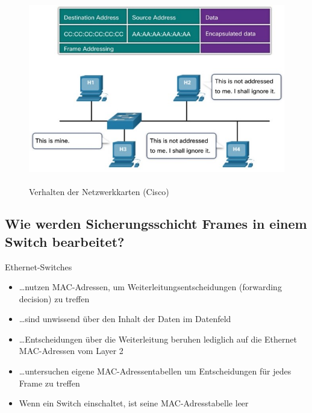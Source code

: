 \begin{figure}[H]
    \begin{center}
    \label{pic:EthernetFrameProcessing}
    \includegraphics[width=\textwidth]{images/Frame_processing.jpg}
    \caption{Verhalten der Netzwerkkarten (\textsuperscript{\textcopyright}Cisco)}
    \end{center}
\end{figure}

\subsection*{Wie werden Sicherungsschicht Frames in einem Switch bearbeitet? }
Ethernet-Switches
\begin{itemize}
    \item \dots{}nutzen MAC-Adressen, um Weiterleitungsentscheidungen (forwarding decision) zu treffen
    \item \dots{}sind unwissend über den Inhalt der Daten im Datenfeld
    \item \dots{}Entscheidungen über die Weiterleitung beruhen lediglich auf die Ethernet MAC-Adressen vom Layer 2
    \item \dots{}untersuchen eigene MAC-Adressentabellen um Entscheidungen für jedes Frame zu treffen
    \item Wenn ein Switch einschaltet, ist seine MAC-Adresstabelle leer
\end{itemize}


